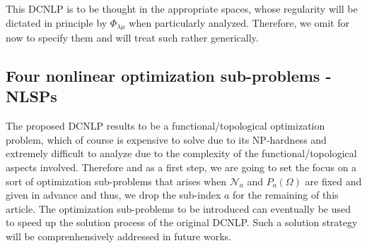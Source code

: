 \begin{remark}
This DCNLP is to be thought in the appropriate spaces, whose regularity will be dictated in principle by $\Phi_{\lambda\mu}$ when particularly analyzed. Therefore, we omit for now to specify them and will treat such rather generically.  
\end{remark}

\subsection{Four nonlinear optimization sub-problems - NLSPs}

The proposed DCNLP results to be a functional/topological optimization problem, which of course is expensive to solve due to its NP-hardness and extremely difficult to analyze due to the complexity of the functional/topological aspects involved. Therefore and as a first step, we are going to set the focus on a sort of optimization sub-problems that arises when $\mathcal{N}_a$ and $P_a(\Omega)$ are fixed and given in advance and thus, we drop the sub-index $a$ for the remaining of this article. The optimization sub-problems to be introduced can eventually be used to speed up the solution process of the original DCNLP. Such a solution strategy will be comprenhensively addressed in future works.     


